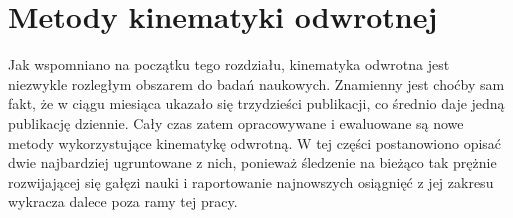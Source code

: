 \documentclass[11pt]{mwrep}
\begin{document}
% 
% 

  \section{Metody kinematyki odwrotnej}

    Jak wspomniano na początku tego rozdziału, kinematyka odwrotna jest niezwykle rozległym obszarem do badań naukowych. Znamienny jest choćby sam fakt, że w ciągu miesiąca ukazało się trzydzieści publikacji, co średnio daje jedną publikację dziennie. Cały czas zatem opracowywane i ewaluowane są nowe metody wykorzystujące kinematykę odwrotną. W tej części postanowiono opisać dwie najbardziej ugruntowane z nich, ponieważ śledzenie na bieżąco tak prężnie rozwijającej się gałęzi nauki i raportowanie najnowszych osiągnięć z jej zakresu wykracza dalece poza ramy tej pracy.
\end{document}
